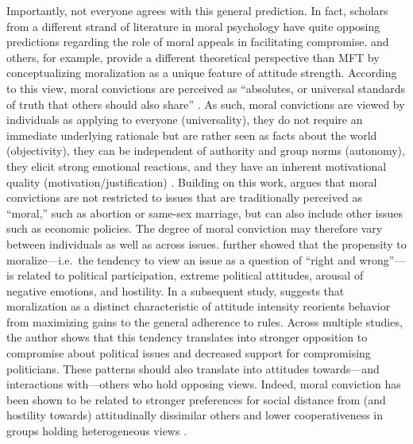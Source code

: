
Importantly, not everyone agrees with this general prediction. In fact, scholars from a different strand of literature in moral psychology have quite opposing predictions regarding the role of moral appeals in facilitating compromise. \citet{skitka2005moral} and others, for example, provide a different theoretical perspective than MFT by conceptualizing moralization as a unique feature of attitude strength. According to this view, moral convictions are perceived as ``absolutes, or universal standards of truth that others should also share'' \citep[269]{skitka2010psychology}. As such, moral convictions are viewed by individuals as applying to everyone (universality), they do not require an immediate underlying rationale but are rather seen as facts about the world (objectivity), they can be independent of authority and group norms (autonomy), they elicit strong emotional reactions, and they have an inherent motivational quality (motivation/justification) \citep{skitka2010psychology}. Building on this work, \citet{ryan2014reconsidering} argues that moral convictions are not restricted to issues that are traditionally perceived as ``moral,'' such as abortion or same-sex marriage, but can also include other issues such as economic policies. The degree of moral conviction may therefore vary between individuals as well as across issues. \citet{ryan2014reconsidering} further showed that the propensity to moralize---i.e.~the tendency to view an issue as a question of ``right and wrong''---is related to political participation, extreme political attitudes, arousal of negative emotions, and hostility. In a subsequent study, \citet{ryan2017no} suggests that moralization as a distinct characteristic of attitude intensity reorients behavior from maximizing gains to the general adherence to rules. Across multiple studies, the author shows that this tendency translates into stronger opposition to compromise about political issues and decreased support for compromising politicians. These patterns should also translate into attitudes towards---and interactions with---others who hold opposing views. Indeed, moral conviction has been shown to be related to stronger preferences for social distance from (and hostility towards) attitudinally dissimilar others and lower cooperativeness in groups holding heterogeneous views \citep{skitka2005moral}.

